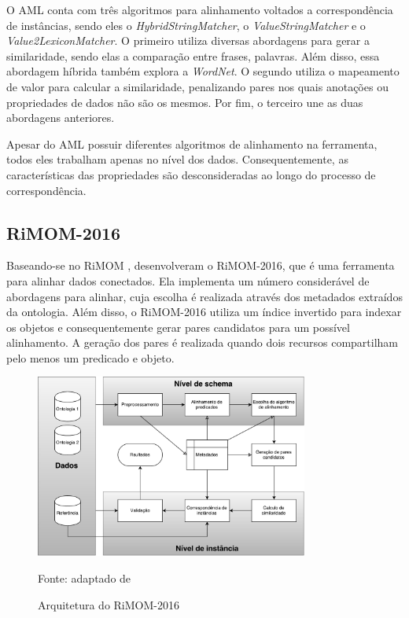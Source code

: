 O AML conta com três algoritmos para alinhamento voltados a correspondência de instâncias, sendo eles o \textit{HybridStringMatcher}, o \textit{ValueStringMatcher} e o \textit{Value2LexiconMatcher}. O primeiro utiliza diversas abordagens para gerar a similaridade, sendo elas a comparação entre frases, palavras. Além disso, essa abordagem híbrida também explora a \textit{WordNet}. O segundo utiliza o mapeamento de valor para calcular a similaridade, penalizando pares nos quais anotações ou propriedades de dados não são os mesmos. Por fim, o terceiro une as duas abordagens anteriores.

Apesar do AML possuir diferentes algoritmos de alinhamento na ferramenta, todos eles trabalham apenas no nível dos dados. Consequentemente, as características das propriedades são desconsideradas ao longo do processo de correspondência.

\subsection{RiMOM-2016}
Baseando-se no RiMOM  \cite{li2009rimom},  desenvolveram o RiMOM-2016, que é uma ferramenta para alinhar dados conectados. Ela implementa um número considerável de abordagens para alinhar, cuja escolha é realizada através dos metadados extraídos da ontologia. Além disso, o RiMOM-2016 utiliza um índice invertido para indexar os objetos e consequentemente gerar pares candidatos para um possível alinhamento. A geração dos pares é realizada quando dois recursos compartilham pelo menos um predicado e objeto.

\begin{figure}[!ht]
	\centering
	\includegraphics[width=0.8\textwidth]{./imagens/rimom_2016.pdf}
    \caption{Arquitetura do RiMOM-2016}
	\footnotesize{Fonte: adaptado de \cite{zhang2016rimom}}
	\label{fig:rimom}
\end{figure}

